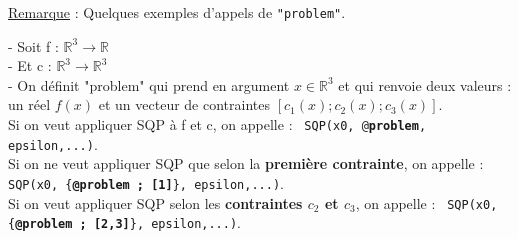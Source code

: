 \underline{Remarque} : Quelques exemples d'appels de \texttt{"problem"}.\medbreak

- Soit f :  $\mathbb{R}^{3} \rightarrow \mathbb{R}$\\
\indent - Et c : $\mathbb{R}^{3} \rightarrow \mathbb{R}^3$\\
\indent - On définit "problem" qui prend en argument $x \in \mathbb{R}^{3} $ et qui renvoie deux valeurs : un réel $f(x)$ et un vecteur de contraintes $[c_1(x);c_2(x);c_3(x)]$.\\
Si on veut appliquer SQP à f et c, on appelle :  \texttt{ SQP(x0, @\textbf{problem}, epsilon,...)}.\\
Si on ne veut appliquer SQP que selon la \textbf{première contrainte}, on appelle : \texttt{ SQP(x0, \{\textbf{@problem ; [1]}\}, epsilon,...)}.\\
Si on veut appliquer SQP selon les \textbf{contraintes $c_2$ et $c_3$}, on appelle : \texttt{ SQP(x0, \{\textbf{@problem ; [2,3]}\}, epsilon,...)}.
\bigbreak